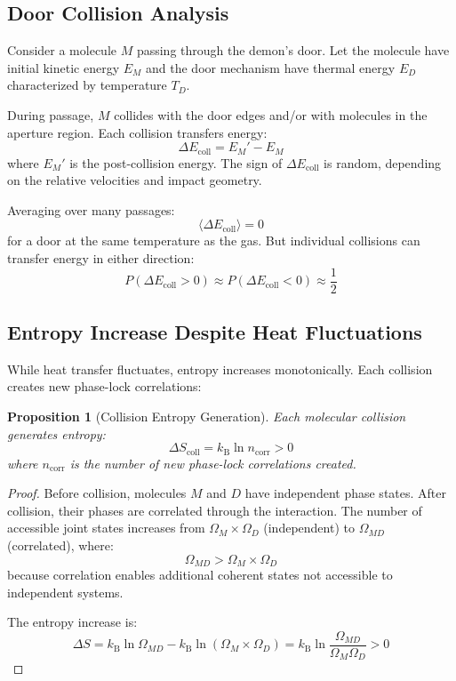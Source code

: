 \documentclass[twocolumn,showpacs,preprintnumbers,amsmath,amssymb,prd]{revtex4-2}
\newtheorem{proposition}[theorem]{Proposition}
\theoremstyle{definition}
\theoremstyle{remark}
\newcommand{\kB}{k_{\mathrm{B}}}
\begin{document}
\subsection{Door Collision Analysis}

Consider a molecule $M$ passing through the demon's door. Let the molecule have initial kinetic energy $E_M$ and the door mechanism have thermal energy $E_D$ characterized by temperature $T_D$.

During passage, $M$ collides with the door edges and/or with molecules in the aperture region. Each collision transfers energy:
\begin{equation}
\Delta E_{\text{coll}} = E_M' - E_M
\end{equation}
where $E_M'$ is the post-collision energy. The sign of $\Delta E_{\text{coll}}$ is random, depending on the relative velocities and impact geometry.

Averaging over many passages:
\begin{equation}
\langle \Delta E_{\text{coll}} \rangle = 0
\end{equation}
for a door at the same temperature as the gas. But individual collisions can transfer energy in either direction:
\begin{equation}
P(\Delta E_{\text{coll}} > 0) \approx P(\Delta E_{\text{coll}} < 0) \approx \frac{1}{2}
\end{equation}

\subsection{Entropy Increase Despite Heat Fluctuations}

While heat transfer fluctuates, entropy increases monotonically. Each collision creates new phase-lock correlations:

\begin{proposition}[Collision Entropy Generation]
\label{prop:collision_entropy}
Each molecular collision generates entropy:
\begin{equation}
\Delta S_{\text{coll}} = \kB \ln n_{\text{corr}} > 0
\end{equation}
where $n_{\text{corr}}$ is the number of new phase-lock correlations created.
\end{proposition}

\begin{proof}
Before collision, molecules $M$ and $D$ have independent phase states. After collision, their phases are correlated through the interaction. The number of accessible joint states increases from $\Omega_M \times \Omega_D$ (independent) to $\Omega_{MD}$ (correlated), where:
\begin{equation}
\Omega_{MD} > \Omega_M \times \Omega_D
\end{equation}
because correlation enables additional coherent states not accessible to independent systems.

The entropy increase is:
\begin{equation}
\Delta S = \kB \ln \Omega_{MD} - \kB \ln(\Omega_M \times \Omega_D) = \kB \ln \frac{\Omega_{MD}}{\Omega_M \Omega_D} > 0
\end{equation}
\end{proof}
\end{document}
